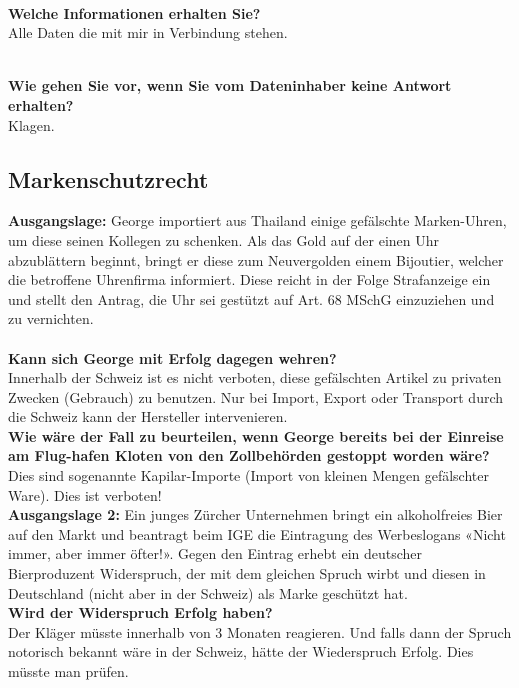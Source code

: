 \mbox{}\\
\textbf{Welche Informationen erhalten Sie?}\\
Alle Daten die mit mir in Verbindung stehen.

\mbox{}\\
\textbf{Wie gehen Sie vor, wenn Sie vom Dateninhaber keine Antwort
erhalten?}\\
Klagen.

\subsection{Markenschutzrecht}

\textbf{Ausgangslage:} George importiert aus Thailand einige gefälschte
Marken-Uhren, um diese seinen Kollegen zu schenken. Als das Gold auf der
einen Uhr abzublättern beginnt, bringt er diese zum Neuvergolden einem
Bijoutier, welcher die betroffene Uhrenfirma informiert. Diese reicht in
der Folge Strafanzeige ein und stellt den Antrag, die Uhr sei gestützt
auf Art. 68 MSchG einzuziehen und zu vernichten.\\
\\
\textbf{Kann sich George mit Erfolg dagegen wehren?}\\
Innerhalb der Schweiz ist es nicht verboten, diese gefälschten Artikel
zu privaten Zwecken (Gebrauch) zu benutzen. Nur bei Import, Export oder
Transport durch die Schweiz kann der Hersteller intervenieren.\\

\textbf{Wie wäre der Fall zu beurteilen, wenn George bereits bei der
Einreise am Flug-hafen Kloten von den Zollbehörden gestoppt worden
wäre?}\\
Dies sind sogenannte Kapilar-Importe (Import von kleinen Mengen
gefälschter Ware). Dies ist verboten!\\

\textbf{Ausgangslage 2:} Ein junges Zürcher Unternehmen bringt ein
alkoholfreies Bier auf den Markt und beantragt beim IGE die Eintragung
des Werbeslogans «Nicht immer, aber immer öfter!». Gegen den Eintrag
erhebt ein deutscher Bierproduzent Widerspruch, der mit dem gleichen
Spruch wirbt und diesen in Deutschland (nicht aber in der Schweiz) als
Marke geschützt hat.\\

\textbf{Wird der Widerspruch Erfolg haben?}\\
Der Kläger müsste innerhalb von 3 Monaten reagieren. Und falls dann der
Spruch notorisch bekannt wäre in der Schweiz, hätte der Wiederspruch
Erfolg. Dies müsste man prüfen.
